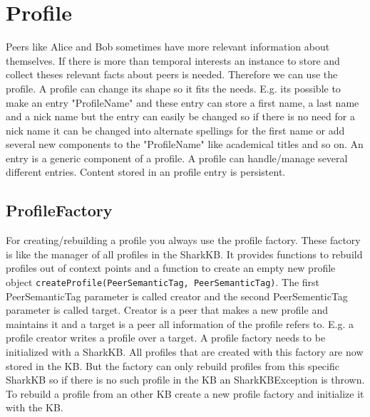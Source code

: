 \section{Profile}
\label{sec:knowledgePorts:Profile}
Peers like Alice and Bob sometimes have more relevant information about themselves. If there is more than temporal interests an instance to store and collect theses relevant facts about peers is needed. Therefore we can use the profile. A profile can change its shape so it fits the needs. E.g. its possible to make an entry "ProfileName" and these entry can store a first name, a last name and a nick name but the entry can easily be changed so if there is no need for a nick name it can be changed into alternate spellings for the first name or add several new components to the "ProfileName" like academical titles and so on. 
An entry is a generic component of a profile. A profile can handle/manage several different entries. Content stored in an profile entry is persistent. 

\subsection{ProfileFactory}
For creating/rebuilding a profile you always use the profile factory. These factory is like the manager of all profiles in the SharkKB. It provides functions to rebuild profiles out of context points and a function to create an empty new profile object {\tt createProfile(PeerSemanticTag, PeerSemanticTag)}. The first PeerSemanticTag parameter is called creator and the second PeerSementicTag parameter is called target. Creator is a peer that makes a new profile and maintains it and a target is a peer all information of the profile refers to. E.g. a profile creator writes a profile over a target. A profile factory needs to be initialized with a SharkKB. All profiles that are created with this factory are now stored in the KB. But the factory can only rebuild profiles from this specific SharkKB so if there is no such profile in the KB an SharkKBException is thrown. To rebuild a profile from an other KB create a new profile factory and initialize it with the KB.

